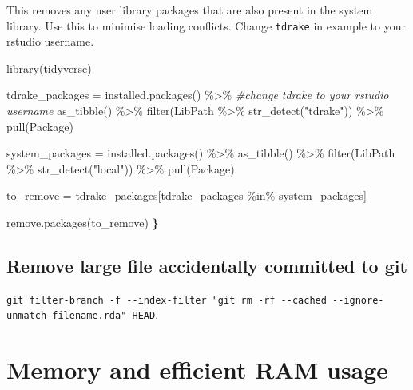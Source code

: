 \documentclass[
]{book}
\newenvironment{Shaded}{\begin{snugshade}}{\end{snugshade}}
\newcommand{\CommentTok}[1]{\textcolor[rgb]{0.56,0.35,0.01}{\textit{#1}}}
\newcommand{\ErrorTok}[1]{\textcolor[rgb]{0.64,0.00,0.00}{\textbf{#1}}}
\newcommand{\FunctionTok}[1]{\textcolor[rgb]{0.00,0.00,0.00}{#1}}
\newcommand{\NormalTok}[1]{#1}
\newcommand{\OtherTok}[1]{\textcolor[rgb]{0.56,0.35,0.01}{#1}}
\newcommand{\SpecialCharTok}[1]{\textcolor[rgb]{0.00,0.00,0.00}{#1}}
\newcommand{\StringTok}[1]{\textcolor[rgb]{0.31,0.60,0.02}{#1}}
\begin{document}
This removes any user library packages that are also present in the system library. Use this to minimise loading conflicts. Change \texttt{tdrake} in example to your rstudio username.

\begin{Shaded}
\begin{Highlighting}[]
\FunctionTok{library}\NormalTok{(tidyverse)}

\NormalTok{tdrake\_packages }\OtherTok{=} \FunctionTok{installed.packages}\NormalTok{() }\SpecialCharTok{\%\textgreater{}\%} \CommentTok{\#change \textquotesingle{}tdrake\textquotesingle{} to your rstudio username}
  \FunctionTok{as\_tibble}\NormalTok{() }\SpecialCharTok{\%\textgreater{}\%} 
  \FunctionTok{filter}\NormalTok{(LibPath }\SpecialCharTok{\%\textgreater{}\%} \FunctionTok{str\_detect}\NormalTok{(}\StringTok{"tdrake"}\NormalTok{)) }\SpecialCharTok{\%\textgreater{}\%} 
  \FunctionTok{pull}\NormalTok{(Package)}

\NormalTok{system\_packages }\OtherTok{=} \FunctionTok{installed.packages}\NormalTok{() }\SpecialCharTok{\%\textgreater{}\%} 
  \FunctionTok{as\_tibble}\NormalTok{() }\SpecialCharTok{\%\textgreater{}\%} 
  \FunctionTok{filter}\NormalTok{(LibPath }\SpecialCharTok{\%\textgreater{}\%} \FunctionTok{str\_detect}\NormalTok{(}\StringTok{"local"}\NormalTok{)) }\SpecialCharTok{\%\textgreater{}\%} 
  \FunctionTok{pull}\NormalTok{(Package)}

\NormalTok{to\_remove }\OtherTok{=}\NormalTok{ tdrake\_packages[tdrake\_packages }\SpecialCharTok{\%in\%}\NormalTok{ system\_packages]}

\FunctionTok{remove.packages}\NormalTok{(to\_remove)}
\ErrorTok{\}}
\end{Highlighting}
\end{Shaded}

\hypertarget{remove-large-file-accidentally-committed-to-git}{%
\subsection{Remove large file accidentally committed to git}\label{remove-large-file-accidentally-committed-to-git}}

\texttt{git\ filter-branch\ -f\ -\/-index-filter\ "git\ rm\ -rf\ -\/-cached\ -\/-ignore-unmatch\ filename.rda"\ HEAD}.

\hypertarget{memory-and-efficient-ram-usage}{%
\section{Memory and efficient RAM usage}\label{memory-and-efficient-ram-usage}}
\end{document}
